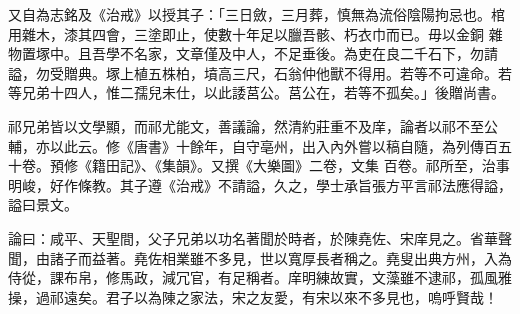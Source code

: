 \begin{pinyinscope}
 又自為志銘及《治戒》以授其子：「三日斂，三月葬，慎無為流俗陰陽拘忌也。棺用雜木，漆其四會，三塗即止，使數十年足以臘吾骸、朽衣巾而已。毋以金銅
 雜物置塚中。且吾學不名家，文章僅及中人，不足垂後。為吏在良二千石下，勿請謚，勿受贈典。塚上植五株柏，墳高三尺，石翁仲他獸不得用。若等不可違命。若等兄弟十四人，惟二孺兒未仕，以此諉莒公。莒公在，若等不孤矣。」後贈尚書。



 祁兄弟皆以文學顯，而祁尤能文，善議論，然清約莊重不及庠，論者以祁不至公輔，亦以此云。修《唐書》十餘年，自守亳州，出入內外嘗以稿自隨，為列傳百五十卷。預修《籍田記》、《集韻》。又撰《大樂圖》二卷，文集
 百卷。祁所至，治事明峻，好作條教。其子遵《治戒》不請謚，久之，學士承旨張方平言祁法應得謚，謚曰景文。



 論曰：咸平、天聖間，父子兄弟以功名著聞於時者，於陳堯佐、宋庠見之。省華聲聞，由諸子而益著。堯佐相業雖不多見，世以寬厚長者稱之。堯叟出典方州，入為侍從，課布帛，修馬政，減冗官，有足稱者。庠明練故實，文藻雖不逮祁，孤風雅操，過祁遠矣。君子以為陳之家法，宋之友愛，有宋以來不多見也，嗚呼賢哉！



\end{pinyinscope}